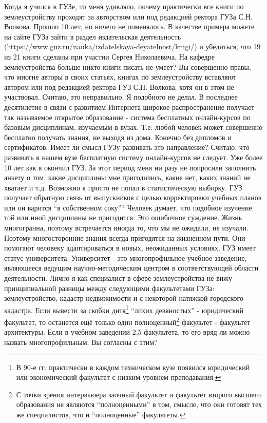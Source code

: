 \begin{drama}
	\maxspeaks Когда я учился в ГУЗе, то меня удивляло, почему практически все книги по землеустройству проходят за авторством или под редакцией ректора ГУЗа С.Н. Волкова. Прошло 10 лет, но ничего не поменялось. В качестве примера можете на сайте ГУЗа зайти в раздел издательская деятельность (https://www.guz.ru/nauka/izdatelskaya-deyatelnost/knigi/) и убедиться, что 19 из 21 книги сделаны при участии Сергея Николаевича. На кафедре землеустройства больше никто книги писать не умеет? 
	\michaelspeaks Вы совершенно правы, что многие авторы в своих статьях, книгах по землеустройству вставляют автором или под редакцией ректора ГУЗ С.Н. Волкова, хотя он в этом не участвовал. Считаю, это неправильно. Я подобного не делал. 
	\maxspeaks В последнее десятилетие в связи с развитием Интернета широкое распространение получает так называемое открытое образование - система бесплатных онлайн-курсов по базовым дисциплинам, изучаемым в вузах. Т.е. любой человек может совершенно бесплатно получать знания, не выходя из дома. Конечно без дипломов и сертификатов. Имеет ли смысл ГУЗу развивать это направление?
	\michaelspeaks Считаю, что развивать в нашем вузе бесплатную систему онлайн-курсов не следует.
	\maxspeaks Уже более 10 лет как я окончил ГУЗ. За этот период меня ни разу не попросили заполнить анкету о том, какие дисциплины мне пригодились, какие нет, каких знаний не хватает и т.д. Возможно я просто не попал в статистическую выборку. ГУЗ получает обратную связь от выпускников с целью корректировки учебных планов или он варится “в собственном соку”?
	\michaelspeaks Человек думает, что подобное изучение той или иной дисциплины не пригодится. Это ошибочное суждение. Жизнь многогранна, поэтому встречается иногда то, что мы не ожидали, не изучали. Поэтому многосторонние знания всегда пригодятся на жизненном пути. Они помогают человеку адаптироваться в новых, неожиданных условиях.
	\maxspeaks ГУЗ имеет статус университета. Университет - это многопрофильное учебное заведение, являющееся ведущим научно-методическим центром в соответствующей области деятельности. 
Лично я как специалист в сфере землеустройства не вижу принципиальной разницы между следующими факультетами ГУЗа: землеустройство, кадастр недвижимости и с некоторой натяжкой городского кадастра. Если вывести за скобки дитя\footnote{В 90-е гг. практически в каждом техническом вузе появился юридический или экономический факультет с низким уровнем преподавания.} “лихих девяностых” - юридический факультет, то останется ещё только один полноценный\footnote{С точки зрения интервьюера заочный факультет и факультет второго высшего образования не являются “полноценными” в том, смысле, что они готовят тех же специалистов, что и “полноценные” факультеты.} факультет - факультет архитектуры. Если в учебном заведении 2,5 факультета, то его вряд ли можно назвать многопрофильным. Вы согласны с этим?

\end{drama}
